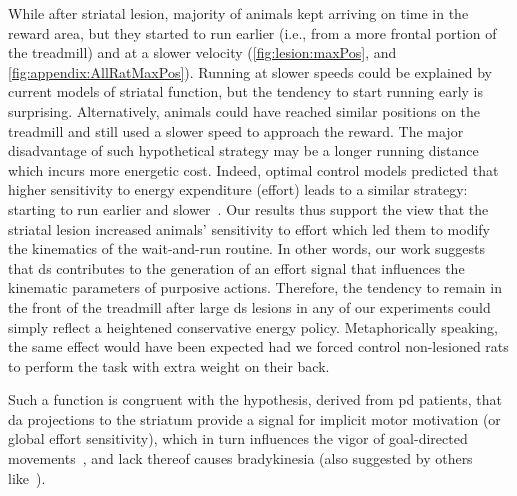While after striatal lesion, majority of animals kept arriving on time in the reward area, but they started to run earlier (i.e., from a more frontal portion of the treadmill) and at a slower velocity (\autoref{fig:lesion:maxPos}, and \autoref{fig:appendix:AllRatMaxPos}).\footnotemark
{}
Running at slower speeds could be explained by current models of striatal function, but the tendency to start running early is surprising.
Alternatively, animals could have reached similar positions on the treadmill and still used a slower speed to approach the reward.
The major disadvantage of such hypothetical strategy may be a longer running distance which incurs more energetic cost.
Indeed, optimal control models predicted that higher sensitivity to energy expenditure (effort) leads to a similar strategy: starting to run earlier and slower~\cite{JuradoParras2020}.
Our results thus support the view that the striatal lesion increased animals' sensitivity to effort which led them to modify the kinematics of the wait-and-run routine.
In other words, our work suggests that \gls{ds} contributes to the generation of an effort signal that influences the kinematic parameters of purposive actions.
Therefore, the tendency to remain in the front of the treadmill after large \gls{ds} lesions in any of our experiments could simply reflect a heightened conservative energy policy.
Metaphorically speaking, the same effect would have been expected had we forced control non-lesioned rats to perform the task with extra weight on their back.
\par
Such a function is congruent with the hypothesis, derived from \gls{pd} patients, that \gls{da} projections to the striatum provide a signal for implicit motor motivation (or global effort sensitivity), which in turn influences the vigor of goal-directed movements~\cite{Mazzoni2007}, and lack thereof causes bradykinesia (also suggested by others like~\cite{Berke2018NN, Beeler2012Fron}).
